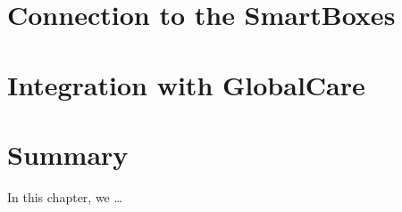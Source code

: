 \section{Connection to the SmartBoxes}

\section{Integration with GlobalCare}

\section{Summary}
In this chapter, we \dots